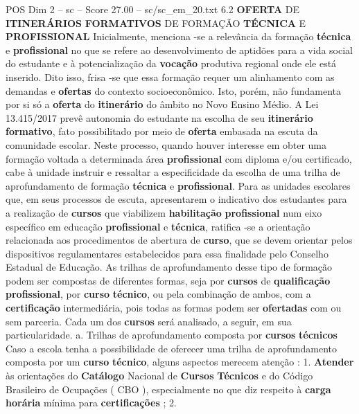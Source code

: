 \begin{textsample}{POS Dim 2 – sc – Score 27.00 – sc/sc\_em\_20.txt}  \label{ex:f2_pos_002}
6.2 \textbf{OFERTA} DE \textbf{ITINERÁRIOS} \textbf{FORMATIVOS} DE FORMAÇÃO \textbf{TÉCNICA} E \textbf{PROFISSIONAL} Inicialmente, menciona -se a relevância da formação \textbf{técnica} e \textbf{profissional} no que se refere ao desenvolvimento de aptidões para a vida social do estudante e à potencialização da \textbf{vocação} produtiva regional onde ele está inserido.
Dito isso, frisa -se que essa formação requer um alinhamento com as demandas e \textbf{ofertas} do contexto socioeconômico.
Isto, porém, não fundamenta por si só a \textbf{oferta} do \textbf{itinerário} do âmbito no Novo Ensino Médio.
A Lei 13.415/2017 prevê autonomia do estudante na escolha de seu \textbf{itinerário} \textbf{formativo}, fato possibilitado por meio de \textbf{oferta} embasada na escuta da comunidade escolar.
Neste processo, quando houver interesse em obter uma formação voltada a determinada área \textbf{profissional} com diploma e/ou certificado, cabe à unidade instruir e ressaltar a especificidade da escolha de uma trilha de aprofundamento de formação \textbf{técnica} e \textbf{profissional}.
Para as unidades escolares que, em seus processos de escuta, apresentarem o indicativo dos estudantes para a realização de \textbf{cursos} que viabilizem \textbf{habilitação} \textbf{profissional} num eixo específico em educação \textbf{profissional} e \textbf{técnica}, ratifica -se a orientação relacionada aos procedimentos de abertura de \textbf{curso}, que se devem orientar pelos dispositivos regulamentares estabelecidos para essa finalidade pelo Conselho Estadual de Educação.
As trilhas de aprofundamento desse tipo de formação podem ser compostas de diferentes formas, seja por \textbf{cursos} de \textbf{qualificação} \textbf{profissional}, por \textbf{curso} \textbf{técnico}, ou pela combinação de ambos, com a \textbf{certificação} intermediária, pois todas as formas podem ser \textbf{ofertadas} com ou sem parceria.
Cada um dos \textbf{cursos} será analisado, a seguir, em sua particularidade. a.
Trilhas de aprofundamento composta por \textbf{cursos} \textbf{técnicos} Caso a escola tenha a possibilidade de oferecer uma trilha de aprofundamento composta por um \textbf{curso} \textbf{técnico}, alguns aspectos merecem atenção : 1. \textbf{Atender} às orientações do \textbf{Catálogo} Nacional de \textbf{Cursos} \textbf{Técnicos} e do Código Brasileiro de Ocupações ( CBO ), especialmente no que diz respeito à \textbf{carga} \textbf{horária} mínima para \textbf{certificações} ; 2.

\end{textsample}
